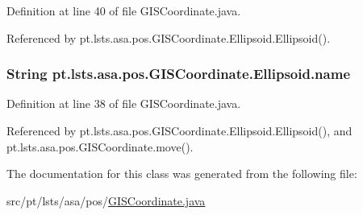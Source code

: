 Definition at line 40 of file G\+I\+S\+Coordinate.\+java.



Referenced by pt.\+lsts.\+asa.\+pos.\+G\+I\+S\+Coordinate.\+Ellipsoid.\+Ellipsoid().

\hypertarget{classpt_1_1lsts_1_1asa_1_1pos_1_1GISCoordinate_1_1Ellipsoid_ae543a217d5f349088f023378690b139c}{}
\subsubsection[{name}]{\setlength{\rightskip}{0pt plus 5cm}String pt.\+lsts.\+asa.\+pos.\+G\+I\+S\+Coordinate.\+Ellipsoid.\+name}\label{classpt_1_1lsts_1_1asa_1_1pos_1_1GISCoordinate_1_1Ellipsoid_ae543a217d5f349088f023378690b139c}


Definition at line 38 of file G\+I\+S\+Coordinate.\+java.



Referenced by pt.\+lsts.\+asa.\+pos.\+G\+I\+S\+Coordinate.\+Ellipsoid.\+Ellipsoid(), and pt.\+lsts.\+asa.\+pos.\+G\+I\+S\+Coordinate.\+move().



The documentation for this class was generated from the following file\+:\begin{DoxyCompactItemize}
\item 
src/pt/lsts/asa/pos/\hyperlink{GISCoordinate_8java}{G\+I\+S\+Coordinate.\+java}\end{DoxyCompactItemize}
